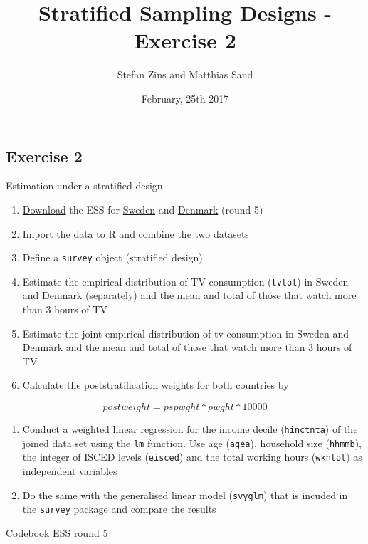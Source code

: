 \documentclass[]{article}
\title{Stratified Sampling Designs - Exercise 2}
\author{Stefan Zins and Matthias Sand}
\date{February, 25th 2017}
\begin{document}
\maketitle

\subsection{Exercise 2}\label{exercise-2}

Estimation under a stratified design

\begin{enumerate}
\def\labelenumi{\arabic{enumi}.}
\item
  \href{https://github.com/BernStZi/SamplingAndEstimation/blob/short/tutorial/preparation/Preparation.md}{Download}
  the ESS for
  \href{http://www.europeansocialsurvey.org/data/country.html?c=sweden}{Sweden}
  and
  \href{http://www.europeansocialsurvey.org/data/country.html?c=denmark}{Denmark}
  (round 5)
\item
  Import the data to R and combine the two datasets
\item
  Define a \texttt{survey} object (stratified design)
\item
  Estimate the empirical distribution of TV consumption (\texttt{tvtot})
  in Sweden and Denmark (separately) and the mean and total of those
  that watch more than 3 hours of TV
\item
  Estimate the joint empirical distribution of tv consumption in Sweden
  and Denmark and the mean and total of those that watch more than 3
  hours of TV
\item
  Calculate the poststratification weights for both countries by
\end{enumerate}

\[postweight = pspwght*pwght*10000\]

\begin{enumerate}
\def\labelenumi{\arabic{enumi}.}
\setcounter{enumi}{6}
\item
  Conduct a weighted linear regression for the income decile
  (\texttt{hinctnta}) of the joined data set using the \texttt{lm}
  function. Use age (\texttt{agea}), household size (\texttt{hhmmb}),
  the integer of ISCED levels (\texttt{eisced}) and the total working
  hours (\texttt{wkhtot}) as independent variables
\item
  Do the same with the generalised linear model (\texttt{svyglm}) that
  is incuded in the \texttt{survey} package and compare the results
\end{enumerate}

\href{http://www.europeansocialsurvey.org/docs/round5/survey/ESS5_appendix_a6_e04_1.pdf}{Codebook
ESS round 5}
\end{document}
